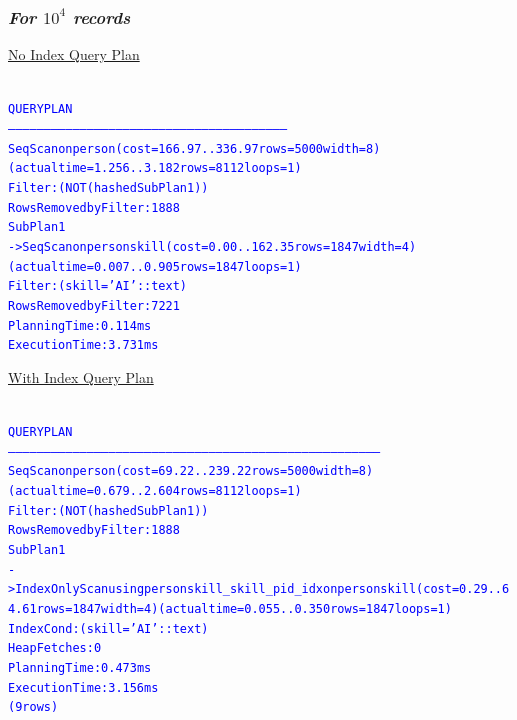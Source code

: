 \documentclass{article}
\begin{document}
    \subsubsection*{\emph{For $10^4$ records}}
    \underline{No Index Query Plan}
    \begin{center}
      {\tiny
      \begin{alltt}
      \textcolor{blue}{
        QUERY PLAN                                                      
        ---------------------------------------------------------------------------------------------------------------------
         Seq Scan on person  (cost=166.97..336.97 rows=5000 width=8) (actual time=1.256..3.182 rows=8112 loops=1)
           Filter: (NOT (hashed SubPlan 1))
           Rows Removed by Filter: 1888
           SubPlan 1
             ->  Seq Scan on personskill  (cost=0.00..162.35 rows=1847 width=4) (actual time=0.007..0.905 rows=1847 loops=1)
                   Filter: (skill = 'AI'::text)
                   Rows Removed by Filter: 7221
         Planning Time: 0.114 ms
         Execution Time: 3.731 ms
       }
      \end{alltt}
      }
    \end{center}
    \underline{With Index Query Plan}
    \begin{center}
      {\tiny
      \begin{alltt}
      \textcolor{blue}{
        QUERY PLAN                                                                         
        -----------------------------------------------------------------------------------------------------------------------------------------------------------
         Seq Scan on person  (cost=69.22..239.22 rows=5000 width=8) (actual time=0.679..2.604 rows=8112 loops=1)
           Filter: (NOT (hashed SubPlan 1))
           Rows Removed by Filter: 1888
           SubPlan 1
             ->  Index Only Scan using personskill_skill_pid_idx on personskill  (cost=0.29..64.61 rows=1847 width=4) (actual time=0.055..0.350 rows=1847 loops=1)
                   Index Cond: (skill = 'AI'::text)
                   Heap Fetches: 0
         Planning Time: 0.473 ms
         Execution Time: 3.156 ms
        (9 rows)
       }
      \end{alltt}
      }
    \end{center}
\end{document}
